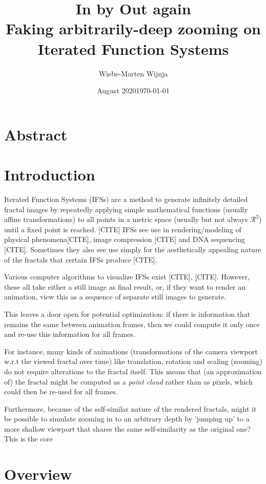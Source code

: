 \documentclass[11pt]{article}
\date{August 2020}
\author{Wiebe-Marten Wijnja}
\date{\today}
\title{\Huge In by Out again\\\medskip
\large Faking arbitrarily-deep zooming on Iterated Function Systems}
\begin{document}
\maketitle
\pagebreak
\setcounter{tocdepth}{3}
\tableofcontents

\section{Abstract}
\label{sec:org853776f}

\section{Introduction}
\label{sec:orgb0cdd90}

Iterated Function Systems (IFSs) are a method to generate infinitely detailed fractal images 
by repeatedly applying simple mathematical functions (usually affine transformations) to all points in a metric space (usually but not always \(\mathcal{R}^2\)) until a fixed point is reached. [CITE]
IFSs see use in rendering/modeling of physical phenomena[CITE], image compression [CITE] and DNA sequencing [CITE].
Sometimes they also see use simply for the aesthetically appealing nature of the fractals that certain IFSs produce [CITE].

Various computer algorithms to visualize IFSs exist [CITE], [CITE].
However, these all take either a still image as final result, or, if they want to render an animation,
view this as a sequence of separate still images to generate.

This leaves a door open for potential optimization: if there is information that remains the same between animation frames, 
then we could compute it only once and re-use this information for all frames.

For instance, many kinds of animations (transformations of the camera viewport w.r.t the viewed fractal over time) like translation, rotation and scaling (zooming) do not require alterations to the fractal itself.
This means that (an approximation of) the fractal might be computed as a \emph{point cloud} rather than as pixels, which could then be re-used for all frames.

Furthermore, because of the self-similar nature of the rendered fractals, 
might it be possible to simulate zooming in to an arbitrary depth by 'jumping up' to a more shallow viewport 
that shares the same self-similarity as the original one?
This is the core

\section{Overview}
\label{sec:org5c6eeb8}
\end{document}
